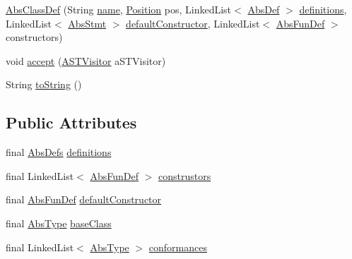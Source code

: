 \begin{DoxyCompactItemize}
\item 
\hyperlink{classcompiler_1_1abstr_1_1tree_1_1def_1_1_abs_class_def_a1aa7f855430f93f7a310a41ca1ea28cf}{Abs\+Class\+Def} (String \hyperlink{classcompiler_1_1abstr_1_1tree_1_1def_1_1_abs_def_ac6bda9377f5abbb5f1be7d3d1b16481b}{name}, \hyperlink{classcompiler_1_1_position}{Position} pos, Linked\+List$<$ \hyperlink{classcompiler_1_1abstr_1_1tree_1_1def_1_1_abs_def}{Abs\+Def} $>$ \hyperlink{classcompiler_1_1abstr_1_1tree_1_1def_1_1_abs_class_def_a150268afc17218143bf4caf8a1db9c96}{definitions}, Linked\+List$<$ \hyperlink{classcompiler_1_1abstr_1_1tree_1_1_abs_stmt}{Abs\+Stmt} $>$ \hyperlink{classcompiler_1_1abstr_1_1tree_1_1def_1_1_abs_class_def_ac9a16d0a80e785164055560fc5b1c198}{default\+Constructor}, Linked\+List$<$ \hyperlink{classcompiler_1_1abstr_1_1tree_1_1def_1_1_abs_fun_def}{Abs\+Fun\+Def} $>$ constructors)
\item 
void \hyperlink{classcompiler_1_1abstr_1_1tree_1_1def_1_1_abs_class_def_aa434e6436a8bc6e08576ac8a9e717128}{accept} (\hyperlink{interfacecompiler_1_1abstr_1_1_a_s_t_visitor}{A\+S\+T\+Visitor} a\+S\+T\+Visitor)
\item 
String \hyperlink{classcompiler_1_1abstr_1_1tree_1_1def_1_1_abs_class_def_afd0453ab01ec4e0b1fd27d379199c8ae}{to\+String} ()
\end{DoxyCompactItemize}
\subsection*{Public Attributes}
\begin{DoxyCompactItemize}
\item 
final \hyperlink{classcompiler_1_1abstr_1_1tree_1_1_abs_defs}{Abs\+Defs} \hyperlink{classcompiler_1_1abstr_1_1tree_1_1def_1_1_abs_class_def_a150268afc17218143bf4caf8a1db9c96}{definitions}
\item 
final Linked\+List$<$ \hyperlink{classcompiler_1_1abstr_1_1tree_1_1def_1_1_abs_fun_def}{Abs\+Fun\+Def} $>$ \hyperlink{classcompiler_1_1abstr_1_1tree_1_1def_1_1_abs_class_def_a92f85380e5e52b03efb8f1307296ba57}{construstors}
\item 
final \hyperlink{classcompiler_1_1abstr_1_1tree_1_1def_1_1_abs_fun_def}{Abs\+Fun\+Def} \hyperlink{classcompiler_1_1abstr_1_1tree_1_1def_1_1_abs_class_def_ac9a16d0a80e785164055560fc5b1c198}{default\+Constructor}
\item 
final \hyperlink{classcompiler_1_1abstr_1_1tree_1_1type_1_1_abs_type}{Abs\+Type} \hyperlink{classcompiler_1_1abstr_1_1tree_1_1def_1_1_abs_class_def_abdae78a199f920488fa89f40fc123fa9}{base\+Class}
\item 
final Linked\+List$<$ \hyperlink{classcompiler_1_1abstr_1_1tree_1_1type_1_1_abs_type}{Abs\+Type} $>$ \hyperlink{classcompiler_1_1abstr_1_1tree_1_1def_1_1_abs_class_def_a702f852366befcc3ccd0f0d28f4dffd3}{conformances}
\end{DoxyCompactItemize}
